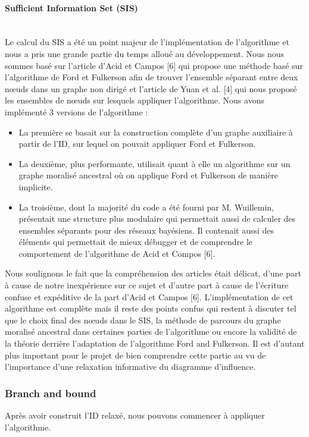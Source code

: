 \documentclass[12pt]{article}
\newcommand{\subsubsubsection}[1]{\paragraph{#1}\mbox{}\\}
\begin{document}
\subsubsubsection{Sufficient Information Set (SIS)}
Le calcul du SIS a été un point majeur de l'implémentation de l'algorithme et nous a pris une grande partie du temps alloué au développement.
\bigbreak
Nous nous sommes basé sur l'article d'Acid et Campos [6] qui propose une méthode basé sur l'algorithme de Ford et Fulkerson afin de trouver l'ensemble séparant entre deux nœuds dans un graphe non dirigé et l'article de Yuan et al. [4] qui nous proposé les ensembles de nœuds sur lesquels appliquer l'algorithme.
\bigbreak
Nous avons implémenté 3 versions de l'algorithme :
\begin{itemize}
    \item La première se basait sur la construction complète d'un graphe auxiliaire à partir de l'ID, sur lequel on pouvait appliquer Ford et Fulkerson.
    \item La deuxième, plus performante, utilisait quant à elle un algorithme sur un graphe moralisé ancestral où on applique Ford et Fulkerson de manière implicite.
    \item La troisième, dont la majorité du code a été fourni par M. Wuillemin, présentait une structure plus modulaire qui permettait aussi de calculer des ensembles séparants pour des réseaux bayésiens. Il contenait aussi des éléments qui permettait de mieux débugger et de comprendre le comportement de l'algorithme de Acid et Compos [6].
\end{itemize}
Nous soulignons le fait que la compréhension des articles était délicat, d'une part à cause de notre inexpérience sur ce sujet et d'autre part à cause de l'écriture confuse et expéditive de la part d'Acid et Campos [6]. L'implémentation de cet algorithme est complète mais il reste des points confus qui restent à discuter tel que le choix final des nœuds dans le SIS, la méthode de parcours du graphe moralisé ancestral dans certaines parties de l'algorithme ou encore la validité de la théorie derrière l'adaptation de l'algorithme Ford and Fulkerson. Il est d'autant plus important pour le projet de bien comprendre cette partie au vu de l'importance d'une relaxation informative du diagramme d'influence.

\subsubsection{Branch and bound}
Après avoir construit l'ID relaxé, nous pouvons commencer à appliquer l'algorithme. 
\end{document}
